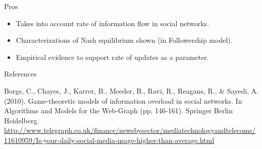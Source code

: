 \documentclass[aspectratio=169]{beamer}
\newcommand{\bi}{\begin{itemize}}
\newcommand{\ei}{\end{itemize}}
\begin{document}
\begin{frame}{Pros}
    \bi
\item Takes into account rate of information flow in social networks.
\item Characterizations of Nash equilibrium shown (in Followership model).
\item Empirical evidence to support rate of updates as a parameter.
    \ei
\end{frame}

\begin{frame}{References}
\begin{thebibliography}{9}
    Borgs, C., Chayes, J., Karrer, B., Meeder, B., Ravi, R., Reagans,
    R., \& Sayedi, A. (2010). Game-theoretic models of information overload in
    social networks. In Algorithms and Models for the Web-Graph (pp. 146-161).
    Springer Berlin Heidelberg.
    \url{http://www.telegraph.co.uk/finance/newsbysector/mediatechnologyandtelecoms/11610959/Is-your-daily-social-media-usage-higher-than-average.html}
\end{thebibliography}

\end{frame}
\end{document}
